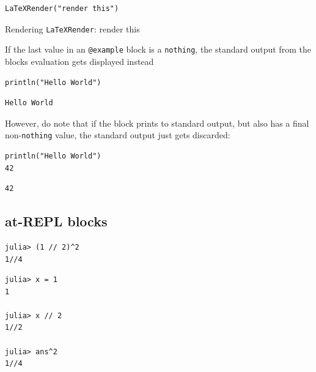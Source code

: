 \begin{verbatim}
LaTeXRender("render this")
\end{verbatim}

Rendering \texttt{LaTeXRender}: render this


If the last value in an \texttt{@example} block is a \texttt{nothing}, the standard output from the blocks{\textquotesingle} evaluation gets displayed instead




\begin{verbatim}
println("Hello World")
\end{verbatim}


\begin{verbatim}
Hello World
\end{verbatim}



However, do note that if the block prints to standard output, but also has a final non-\texttt{nothing} value, the standard output just gets discarded:




\begin{verbatim}
println("Hello World")
42
\end{verbatim}


\begin{verbatim}
42
\end{verbatim}



\subsection{at-REPL blocks}



\label{8212101768234630169}{}



\begin{verbatim}
julia> (1 // 2)^2
1//4
\end{verbatim}




\begin{verbatim}
julia> x = 1
1

julia> x // 2
1//2

julia> ans^2
1//4
\end{verbatim}



